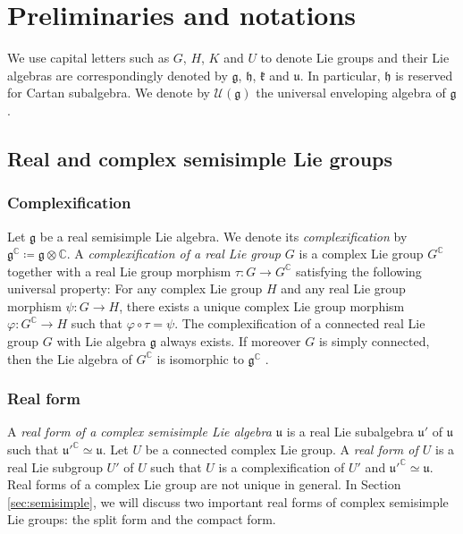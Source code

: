 \documentclass[11pt,reqno]{amsart}
\newcommand{\CC}{\mathbb{C}} %
\begin{document}
\section{Preliminaries and notations}
We use capital letters such as $G$,  $H$,  $K$ and $U$ to denote Lie groups and their Lie algebras are correspondingly denoted by $\mathfrak{g}$,  $\mathfrak{h}$,  $\mathfrak{k} $ and $\mathfrak{u}$.  In particular,  $\mathfrak{h}$ is reserved for Cartan subalgebra.  We denote by $\mathcal{U}(\mathfrak{g})$ the universal enveloping algebra of $\mathfrak{g}$. 


\subsection{Real and complex semisimple Lie groups}

\subsubsection{Complexification}
Let $\mathfrak{g}$ be a real semisimple Lie algebra.  We denote its \emph{complexification} by $\mathfrak{g}^{\mathbb{C}} \coloneqq \mathfrak{g} \otimes \mathbb{C}$.  A \emph{complexification of a real Lie group $G$} \cite[Chapitre 3]{bourbaki2006groupes} is a complex Lie group $G^{\CC}$ together with a real Lie group morphism $\tau: G \to G^{\CC}$ satisfying the following universal property: For any complex Lie group $H$ and any real Lie group morphism $\psi: G \to H$,  there exists a unique complex Lie group morphism $\varphi: G^{\CC} \to H$ such that $\varphi \circ \tau = \psi$. The complexification of a connected real Lie group $G$ with Lie algebra $\mathfrak{g}$ always exists.  If moreover $G$ is simply connected,  then the Lie algebra of $G^\CC$ is isomorphic to $\mathfrak{g}^\CC$ \cite[Chapitre 3,4,5,6]{bourbaki2006groupes}.

\subsubsection{Real form}
A \emph{real form of a complex semisimple Lie algebra $\mathfrak{u}$} \cite[Lecture 26]{fulton2013representation} is a real Lie subalgebra $\mathfrak{u}'$ of $\mathfrak{u}$ such that ${\mathfrak{u}'}^{\mathbb{C}}\simeq \mathfrak{u}$.  Let $U$ be a connected complex Lie group.  A \emph{real form of $U$} is a real Lie subgroup $U'$ of $U$ such that $U$ is a complexification of $U'$ and $\mathfrak{u}'^{\CC} \simeq \mathfrak{u}$. Real forms of a complex Lie group are not unique in general.  In Section \ref{sec:semisimple}, we will discuss two important real forms of complex semisimple Lie groups: the split form and the compact form.
\end{document}
